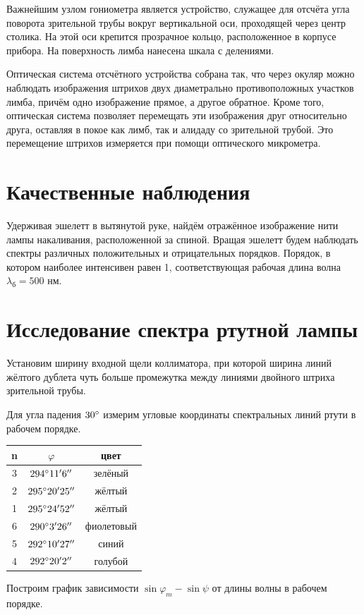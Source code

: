 \documentclass[12pt]{article}
\begin{document}
\par
	Важнейшим узлом гониометра является устройство, служащее для отсчёта угла поворота зрительной трубы вокруг вертикальной оси, проходящей через центр столика. На этой оси крепится прозрачное кольцо, расположенное в корпусе прибора. На поверхность лимба нанесена шкала с делениями.
\par
	Оптическая система отсчётного устройства собрана так, что через окуляр можно наблюдать изображения штрихов двух диаметрально противоположных участков лимба, причём одно изображение прямое, а другое обратное. Кроме того, оптическая система позволяет перемещать эти изображения друг относительно друга, оставляя в покое как лимб, так и алидаду со зрительной трубой. Это перемещение штрихов измеряется при помощи оптического микрометра.

\section*{Качественные наблюдения}
\par
	Удерживая эшелетт в вытянутой руке, найдём отражённое изображение нити лампы накаливания, расположенной за спиной. Вращая эшелетт будем наблюдать спектры различных положительных и отрицательных порядков. Порядок, в котором наиболее интенсивен равен 1, соответствующая рабочая длина волна $\lambda_\text{б} = 500$ нм.

\section*{Исследование спектра ртутной лампы}
\par
	Установим ширину входной щели коллиматора, при которой ширина линий жёлтого дублета чуть больше промежутка между линиями двойного штриха зрительной трубы.
\par
	Для угла падения $30 \degree$ измерим угловые координаты спектральных линий ртути в рабочем порядке.
\begin{table}[h!]
	\centering
	\begin{tabular}{|c|c|c|}
	\hline
		n & $\varphi$ & цвет \\
	\hline
		3 & $294 \degree 11' 6''$ & зелёный \\
	\hline
		2 & $295 \degree 20' 25''$ & жёлтый \\
	\hline
		1 & $295 \degree 24' 52''$ & жёлтый \\
	\hline
		6 & $290 \degree 3' 26''$ & фиолетовый \\
	\hline
		5 & $292 \degree 10' 27''$ & синий \\
	\hline
		4 & $292 \degree 20' 2''$ & голубой \\
	\hline
	\end{tabular}
\end{table}
\par
	Построим график зависимости $\sin \varphi_m - \sin \psi$ от длины волны в рабочем порядке.
\end{document}
